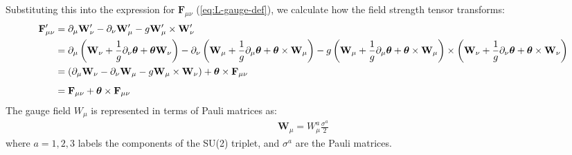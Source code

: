 \begin{enumerate}
    Substituting this into the expression for $\mathbf{F}_{\mu\nu}$ (\ref{eq:L-gauge-def}), we calculate how the field strength tensor transforms:
    \begin{align}
        \mathbf{F}_{\mu\nu}^\prime &= \partial_\mu \mathbf{W}_\nu ^\prime - \partial_\nu \mathbf{W}_\mu^\prime - g \mathbf{W}_\mu^\prime \times \mathbf{W}_\nu ^\prime \notag \\
        &= \partial_\mu \left( \mathbf{W}_\nu + \frac{1}{g} \partial_\nu \boldsymbol{\theta} + \boldsymbol{\theta}  \mathbf{W}_\nu \right)
        - \partial_\nu \left( \mathbf{W}_\mu + \frac{1}{g} \partial_\mu \boldsymbol{\theta} + \boldsymbol{\theta} \times \mathbf{W}_\mu \right) - g \left( \mathbf{W}_\mu + \frac{1}{g} \partial_\mu \boldsymbol{\theta} + \boldsymbol{\theta} \times \mathbf{W}_\mu \right) \times \left( \mathbf{W}_\nu + \frac{1}{g} \partial_\nu \boldsymbol{\theta} + \boldsymbol{\theta} \times \mathbf{W}_\nu \right) \notag \\
        &= \left( \partial_\mu \mathbf{W}_\nu - \partial_\nu \mathbf{W}_\mu - g \mathbf{W}_\mu \times \mathbf{W}_\nu \right)
        + \boldsymbol{\theta} \times \mathbf{F}_{\mu\nu} \notag \\[5pt]
        &= \mathbf{F}_{\mu\nu} + \boldsymbol{\theta} \times \mathbf{F}_{\mu\nu}\label{eq:F-mu-nu-transformation}
    \end{align}
    The gauge field $W_\mu$ is represented in terms of Pauli matrices as:
    \begin{align}
        \mathbf{W}_\mu = W_\mu^a \frac{\sigma^a}{2}
    \end{align}
    where $a = 1, 2, 3$ labels the components of the SU(2) triplet, and $\sigma^a$ are the Pauli matrices.
    

\end{enumerate}
